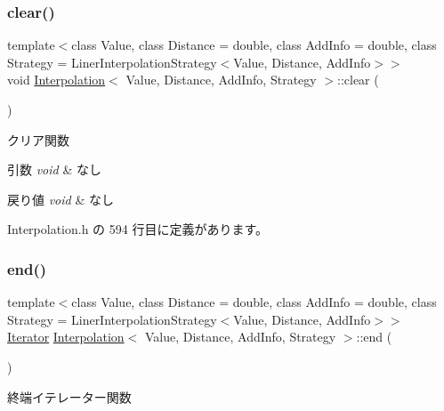 \subsubsection{\texorpdfstring{clear()}{clear()}}
{\footnotesize\ttfamily template$<$class Value, class Distance = double, class Add\+Info = double, class Strategy = Liner\+Interpolation\+Strategy$<$\+Value, Distance, Add\+Info$>$$>$ \\
void \mbox{\hyperlink{class_interpolation}{Interpolation}}$<$ Value, Distance, Add\+Info, Strategy $>$\+::clear (\begin{DoxyParamCaption}{ }\end{DoxyParamCaption})\hspace{0.3cm}{\ttfamily [inline]}}



クリア関数 


\begin{DoxyParams}{引数}
{\em void} & なし \\
\hline
\end{DoxyParams}

\begin{DoxyRetVals}{戻り値}
{\em void} & なし \\
\hline
\end{DoxyRetVals}


 Interpolation.\+h の 594 行目に定義があります。

\mbox{\label{class_interpolation_a9c63d39c9245a28228784ebff60ae4b1}} 
\subsubsection{\texorpdfstring{end()}{end()}}
{\footnotesize\ttfamily template$<$class Value, class Distance = double, class Add\+Info = double, class Strategy = Liner\+Interpolation\+Strategy$<$\+Value, Distance, Add\+Info$>$$>$ \\
\mbox{\hyperlink{class_interpolation_a066eb9906faf7f1d56ba68d00c6be64a}{Iterator}} \mbox{\hyperlink{class_interpolation}{Interpolation}}$<$ Value, Distance, Add\+Info, Strategy $>$\+::end (\begin{DoxyParamCaption}{ }\end{DoxyParamCaption})\hspace{0.3cm}{\ttfamily [inline]}}



終端イテレーター関数 


